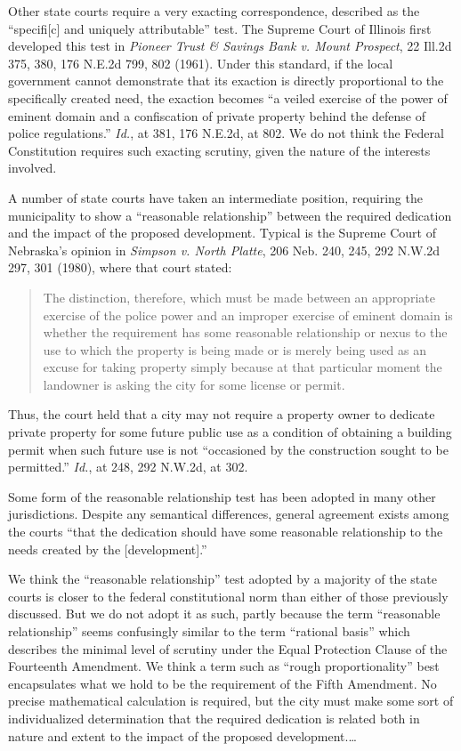 Other state courts require a very exacting correspondence, described as the
``specifi[c] and uniquely attributable'' test. The Supreme Court of Illinois
first developed this test in \textit{Pioneer Trust \& Savings Bank v. Mount
Prospect}, 22 Ill.2d 375, 380, 176 N.E.2d 799, 802 (1961). Under this standard,
if the local government cannot demonstrate that its exaction is directly
proportional to the specifically created need, the exaction becomes ``a veiled
exercise of the power of eminent domain and a confiscation of private property
behind the defense of police regulations.'' \textit{Id.}, at 381, 176 N.E.2d, at
802. We do not think the Federal Constitution requires such exacting scrutiny,
given the nature of the interests involved.

A number of state courts have taken an intermediate position, requiring the
municipality to show a ``reasonable relationship'' between the required
dedication and the impact of the proposed development. Typical is the Supreme
Court of Nebraska's opinion in \textit{Simpson v. North Platte}, 206 Neb. 240,
245, 292 N.W.2d 297, 301 (1980), where that court stated:
\begin{quote}
The distinction, therefore, which must be made between an appropriate exercise
of the police power and an improper exercise of eminent domain is whether the
requirement has some reasonable relationship or nexus to the use to which the
property is being made or is merely being used as an excuse for taking property
simply because at that particular moment the landowner is asking the city for
some license or permit.
\end{quote}

Thus, the court held that a city may not require a property owner to dedicate
private property for some future public use as a condition of obtaining a
building permit when such future use is not ``occasioned by the construction
sought to be permitted.'' \textit{Id.}, at 248, 292 N.W.2d, at 302.

Some form of the reasonable relationship test has been adopted in many other
jurisdictions. Despite any semantical differences, general agreement exists
among the courts ``that the dedication should have some reasonable relationship
to the needs created by the [development].'' 

We think the ``reasonable relationship'' test adopted by a majority of the state
courts is closer to the federal constitutional norm than either of those
previously discussed. But we do not adopt it as such, partly because the term
``reasonable relationship'' seems confusingly similar to the term ``rational
basis'' which describes the minimal level of scrutiny under the Equal Protection
Clause of the Fourteenth Amendment. We think a term such as ``rough
proportionality'' best encapsulates what we hold to be the requirement of the
Fifth Amendment. No precise mathematical calculation is required, but the city
must make some sort of individualized determination that the required dedication
is related both in nature and extent to the impact of the proposed
development.\ldots

